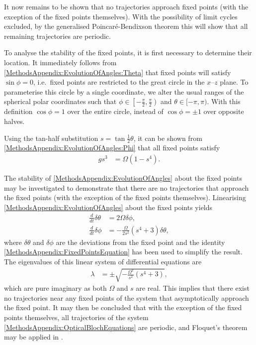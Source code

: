 It now remains to be shown that no trajectories approach fixed points (with the exception of the fixed points themselves).  With the possibility of limit cycles excluded, by the generalised Poincaré-Bendixson theorem this will show that all remaining trajectories are periodic.

To analyse the stability of the fixed points, it is first necessary to determine their location.  It immediately follows from \eqref{MethodsAppendix:EvolutionOfAngles:Theta} that fixed points will satisfy $\sin\phi = 0$, i.e.\ fixed points are restricted to the great circle in the $x$--$z$ plane.  To parameterise this circle by a single coordinate, we alter the usual ranges of the spherical polar coordinates such that $\phi \in \left[-\frac{\pi}{2}, \frac{\pi}{2}\right)$ and $\theta \in [-\pi, \pi)$.  With this definition $\cos\phi = 1$ over the entire circle, instead of $\cos\phi = \pm 1$ over opposite halves.

Using the tan-half substitution $s = \tan\frac{1}{2}\theta$, it can be shown from \eqref{MethodsAppendix:EvolutionOfAngles:Phi} that all fixed points satisfy
\begin{align}
    g s^3 &= \Omega (1 - s^4). \label{MethodsAppendix:FixedPointsEquation}
\end{align}

The stability of \eqref{MethodsAppendix:EvolutionOfAngles} about the fixed points may be investigated to demonstrate that there are no trajectories that approach the fixed points (with the exception of the fixed points themselves).  Linearising \eqref{MethodsAppendix:EvolutionOfAngles} about the fixed points yields
\begin{align}
    \frac{d}{dt} \delta \theta &= 2 \Omega \delta \phi,\\
    \frac{d}{dt} \delta \phi &= - \frac{\Omega}{2 s^2}(s^4 + 3) \delta \theta,
\end{align}
where $\delta \theta$ and $\delta\phi$ are the deviations from the fixed point and the identity \eqref{MethodsAppendix:FixedPointsEquation} has been used to simplify the result.  The eigenvalues of this linear system of differential equations are
\begin{align}
    \lambda &= \pm\sqrt{- \frac{\Omega^2}{s^2}(s^4 + 3)},
\end{align}
which are pure imaginary as both $\Omega$ and $s$ are real.  This implies that there exist no trajectories near any fixed points of the system that asymptotically approach the fixed point.  It may then be concluded that with the exception of the fixed points themselves, all trajectories of the system \eqref{MethodsAppendix:OpticalBlochEquations} are periodic, and Floquet's theorem may be applied in .

